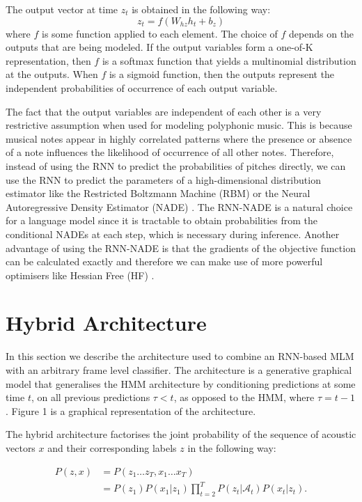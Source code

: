 \documentclass{article}
\begin{document}
The output vector at time $z_t$ is obtained in the following way:
\begin{equation}
 z_t = f(W_{hz}h_t + b_z)
\end{equation} where $f$ is some function applied to each element. The choice of $f$ depends on the outputs that are being modeled. If the output variables form a one-of-K representation, then $f$ is a softmax function that yields a multinomial distribution at the outputs. When $f$ is a sigmoid function, then the outputs represent the independent probabilities of occurrence of each output variable. 

The fact that the output variables are independent of each other is a very restrictive assumption when used for modeling polyphonic music. This is because musical notes appear in highly correlated patterns where the presence or absence of a note influences the likelihood of occurrence of all other notes. Therefore, instead of using the RNN to predict the probabilities of pitches directly, we can use the RNN to predict the parameters of a high-dimensional distribution estimator like the Restricted Boltzmann Machine (RBM) or the Neural Autoregressive Density Estimator (NADE) \cite{boulanger2012modeling}. The RNN-NADE is a natural choice for a language model since it is tractable to obtain probabilities from the conditional NADEs at each step, which is necessary during inference. Another advantage of using the RNN-NADE is that the gradients of the objective function can be calculated exactly and therefore we can make use of more powerful optimisers like Hessian Free (HF) \cite{Martens2011}.  


\section{Hybrid Architecture}

In this section we describe the architecture used to combine an RNN-based MLM with an arbitrary frame level classifier. The architecture is a generative graphical model that generalises the HMM architecture by conditioning predictions at some time $t$, on all previous predictions $\tau < t$, as opposed to the HMM, where $\tau = t-1$. Figure 1 is a graphical representation of the architecture. 


The hybrid architecture factorises the joint probability of the sequence of acoustic vectors $x$ and their corresponding labels $z$ in the following way:

\begin{align}
 P(z,x) &= P(z_{1} \ldots z_{T} , x_{1} \ldots x_{T}) \\ 
  &= P(z_1)P(x_{1}|z_1) \prod_{t=2}^{T} P(z_t|\mathcal{A}_t) P(x_t|z_t). \\ \nonumber
\end{align}
\end{document}
